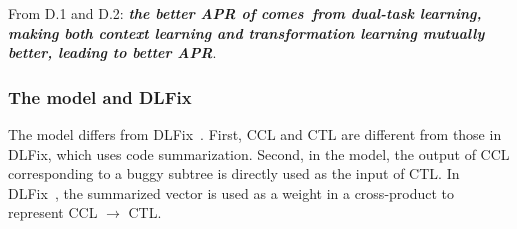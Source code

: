 


From D.1 and D.2: {\bf {\em the better APR of {\tool}
    comes~from dual-task learning,
 making both context learning and transformation learning mutually
 better, leading to better APR}}.






\subsubsection{{\bf The  model and DLFix~\cite{icse20}}}

The  model differs from DLFix~\cite{icse20}. First,
CCL and CTL are different from those in
DLFix, which uses code summarization. Second, in the 
model, the output of CCL corresponding to a buggy subtree is directly
used as the input of CTL. In DLFix~\cite{icse20}, the summarized
vector is used as a weight in a cross-product to represent 
CCL $\rightarrow$ CTL.


